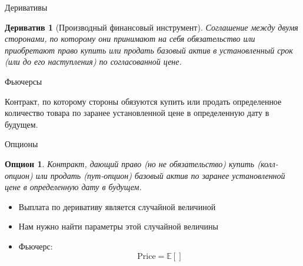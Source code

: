 \documentclass{beamer}
\newtheorem{derivative*}{Дериватив}
\newtheorem{option*}{Опцион}
\newcommand{\E}{\ensuremath{\mathbb{E}}}
\begin{document}
        \begin{frame}{Деривативы}
            \begin{derivative*}[Производный финансовый инструмент]
                Соглашение между двумя сторонами, по которому они принимают на себя обязательство или приобретают право купить или продать базовый актив в установленный срок (или до его наступления) по согласованной цене.
            \end{derivative*}
        \end{frame}

        \begin{frame}{Фьючерсы}
            \begin{futures*}
                Контракт, по которому стороны обязуются купить или продать определенное количество товара по заранее установленной цене в определенную дату в будущем.
            \end{futures*}
        \end{frame}

        \begin{frame}{Опционы}
            \begin{option*}
                Контракт, дающий право (но не обязательство) купить (колл-опцион) или продать (пут-опцион) базовый актив по заранее установленной цене в определенную дату в будущем.
            \end{option*}
        \end{frame}

        \begin{Расчет стоимости}
            \begin{itemize}
                \item Выплата по деривативу является случайной величиной
                \item Нам нужно найти параметры этой случайной величины
            \end{itemize}
            \begin{itemize}
                \item Фьючерс:
                \[
                    \mathrm{Price} = \E \left[  \right]
                \]
            \end{itemize}
        \end{Расчет стоимости}


    
\end{document}
